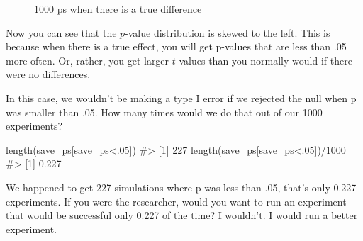 \documentclass[
  letterpaper,
  DIV=11,
  numbers=noendperiod]{scrreprt}
\newenvironment{Shaded}{\begin{snugshade}}{\end{snugshade}}
\newcommand{\CommentTok}[1]{\textcolor[rgb]{0.37,0.37,0.37}{#1}}
\newcommand{\DecValTok}[1]{\textcolor[rgb]{0.68,0.00,0.00}{#1}}
\newcommand{\FunctionTok}[1]{\textcolor[rgb]{0.28,0.35,0.67}{#1}}
\newcommand{\NormalTok}[1]{\textcolor[rgb]{0.00,0.23,0.31}{#1}}
\newcommand{\SpecialCharTok}[1]{\textcolor[rgb]{0.37,0.37,0.37}{#1}}
\begin{document}
\begin{figure}


\caption{\label{fig-7simtrueps}1000 ps when there is a true difference}

\end{figure}%

Now you can see that the \(p\)-value distribution is skewed to the left.
This is because when there is a true effect, you will get p-values that
are less than .05 more often. Or, rather, you get larger \(t\) values
than you normally would if there were no differences.

In this case, we wouldn't be making a type I error if we rejected the
null when p was smaller than .05. How many times would we do that out of
our 1000 experiments?

\begin{Shaded}
\begin{Highlighting}[]
\FunctionTok{length}\NormalTok{(save\_ps[save\_ps}\SpecialCharTok{\textless{}}\NormalTok{.}\DecValTok{05}\NormalTok{])}
\CommentTok{\#\textgreater{} [1] 227}
\FunctionTok{length}\NormalTok{(save\_ps[save\_ps}\SpecialCharTok{\textless{}}\NormalTok{.}\DecValTok{05}\NormalTok{])}\SpecialCharTok{/}\DecValTok{1000}
\CommentTok{\#\textgreater{} [1] 0.227}
\end{Highlighting}
\end{Shaded}

We happened to get 227 simulations where p was less than .05, that's
only 0.227 experiments. If you were the researcher, would you want to
run an experiment that would be successful only 0.227 of the time? I
wouldn't. I would run a better experiment.
\end{document}
